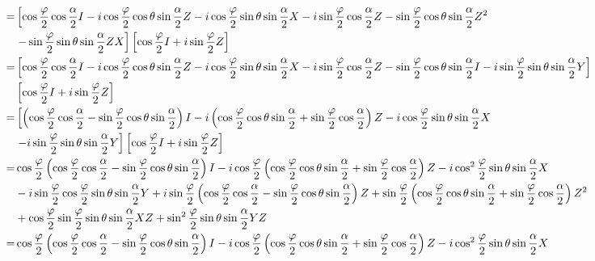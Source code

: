 \documentclass[en]{sol-man}
\begin{document}
\begin{pf}
\begin{align}
        \notag=&\left[\cos\frac{\varphi}{2}\cos\frac{\alpha}{2}I-i\cos\frac{\varphi}{2}\cos\theta\sin\frac{\alpha}{2}Z-i\cos\frac{\varphi}{2}\sin\theta\sin\frac{\alpha}{2}X-i\sin\frac{\varphi}{2}\cos\frac{\alpha}{2}Z-\sin\frac{\varphi}{2}\cos\theta\sin\frac{\alpha}{2}Z^2\right.\\
        \notag&\left.-\sin\frac{\varphi}{2}\sin\theta\sin\frac{\alpha}{2}ZX\right]\left[\cos\frac{\varphi}{2}I+i\sin\frac{\varphi}{2}Z\right]\\
        \notag=&\left[\cos\frac{\varphi}{2}\cos\frac{\alpha}{2}I-i\cos\frac{\varphi}{2}\cos\theta\sin\frac{\alpha}{2}Z-i\cos\frac{\varphi}{2}\sin\theta\sin\frac{\alpha}{2}X-i\sin\frac{\varphi}{2}\cos\frac{\alpha}{2}Z-\sin\frac{\varphi}{2}\cos\theta\sin\frac{\alpha}{2}I-i\sin\frac{\varphi}{2}\sin\theta\sin\frac{\alpha}{2}Y\right]\\
        \notag&\left[\cos\frac{\varphi}{2}I+i\sin\frac{\varphi}{2}Z\right]\\
        \notag=&\left[\left(\cos\frac{\varphi}{2}\cos\frac{\alpha}{2}-\sin\frac{\varphi}{2}\cos\theta\sin\frac{\alpha}{2}\right)I-i\left(\cos\frac{\varphi}{2}\cos\theta\sin\frac{\alpha}{2}+\sin\frac{\varphi}{2}\cos\frac{\alpha}{2}\right)Z-i\cos\frac{\varphi}{2}\sin\theta\sin\frac{\alpha}{2}X\right.\\
        \notag&\left.-i\sin\frac{\varphi}{2}\sin\theta\sin\frac{\alpha}{2}Y\right]\left[\cos\frac{\varphi}{2}I+i\sin\frac{\varphi}{2}Z\right]\\
        \notag=&\cos\frac{\varphi}{2}\left(\cos\frac{\varphi}{2}\cos\frac{\alpha}{2}-\sin\frac{\varphi}{2}\cos\theta\sin\frac{\alpha}{2}\right)I-i\cos\frac{\varphi}{2}\left(\cos\frac{\varphi}{2}\cos\theta\sin\frac{\alpha}{2}+\sin\frac{\varphi}{2}\cos\frac{\alpha}{2}\right)Z-i\cos^2\frac{\varphi}{2}\sin\theta\sin\frac{\alpha}{2}X\\
        \notag&-i\sin\frac{\varphi}{2}\cos\frac{\varphi}{2}\sin\theta\sin\frac{\alpha}{2}Y+i\sin\frac{\varphi}{2}\left(\cos\frac{\varphi}{2}\cos\frac{\alpha}{2}-\sin\frac{\varphi}{2}\cos\theta\sin\frac{\alpha}{2}\right)Z+\sin\frac{\varphi}{2}\left(\cos\frac{\varphi}{2}\cos\theta\sin\frac{\alpha}{2}+\sin\frac{\varphi}{2}\cos\frac{\alpha}{2}\right)Z^2\\
        \notag&+\cos\frac{\varphi}{2}\sin\frac{\varphi}{2}\sin\theta\sin\frac{\alpha}{2}XZ+\sin^2\frac{\varphi}{2}\sin\theta\sin\frac{\alpha}{2}YZ\\
        \notag=&\cos\frac{\varphi}{2}\left(\cos\frac{\varphi}{2}\cos\frac{\alpha}{2}-\sin\frac{\varphi}{2}\cos\theta\sin\frac{\alpha}{2}\right)I-i\cos\frac{\varphi}{2}\left(\cos\frac{\varphi}{2}\cos\theta\sin\frac{\alpha}{2}+\sin\frac{\varphi}{2}\cos\frac{\alpha}{2}\right)Z-i\cos^2\frac{\varphi}{2}\sin\theta\sin\frac{\alpha}{2}X\\

\end{align}
\end{pf}
\end{document}
